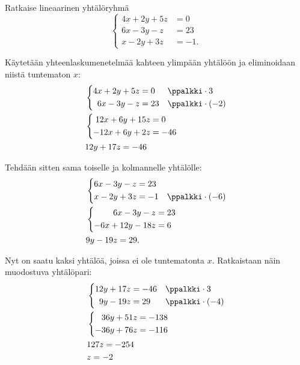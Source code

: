 \begin{esimerkki}
Ratkaise lineaarinen yhtälöryhmä
\[
\left\{
\begin{aligned}
4x+2y+5z&=0 \\
6x-3y-z&= 23 \\
x-2y+3z&= -1.
\end{aligned}
\right.
\]
\begin{esimratk}
Käytetään yhteenlaskumenetelmää kahteen ylimpään yhtälöön ja eliminoidaan niistä tuntematon $x$:
\begin{align*}
&\left\{
\begin{aligned}
4x+2y+5z&=0 && \ppalkki \cdot 3 \\
6x-3y-z&= 23 && \ppalkki \cdot (-2) \\
\end{aligned}
\right. \\
&\left\{
\begin{aligned}
12x+6y+15z&=0 \\
-12x+6y+2z&= -46 \\
\end{aligned}
\right. \\
&12y+17z=-46 \\
\end{align*}

Tehdään sitten sama toiselle ja kolmannelle yhtälölle:
\begin{align*}
&\left\{
\begin{aligned}
6x-3y-z&= 23 && \\
x-2y+3z&= -1 && \ppalkki \cdot (-6)
\end{aligned}
\right. \\
&\left\{
\begin{aligned}
6x-3y-z&= 23 \\
-6x+12y-18z&=6
\end{aligned}
\right. \\
&9y-19z=29. \\
\end{align*}

Nyt on saatu kaksi yhtälöä, joissa ei ole tuntematonta $x$. Ratkaistaan näin muodostuva yhtälöpari:
\begin{align*}
&\left\{
\begin{aligned}
12y+17z&=-46 && \ppalkki \cdot 3 \\
9y-19z&=29 && \ppalkki \cdot (-4) \\
\end{aligned}
\right. \\
&\left\{
\begin{aligned}
36y+51z&=-138  \\
-36y+76z&=-116  \\
\end{aligned}
\right. \\
&127z=-254 \\
&z=-2 \\
\end{align*}


\end{esimratk}
\end{esimerkki}
